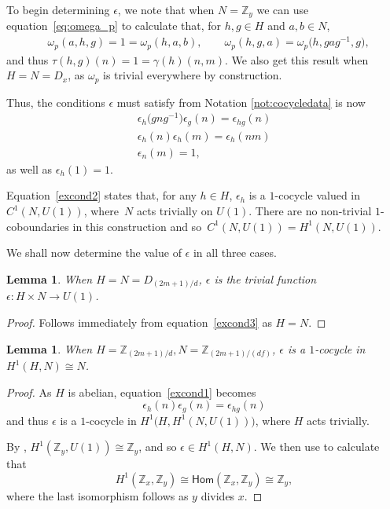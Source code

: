 \documentclass[pdftex]{sigma}
\numberwithin{equation}{section}
\newtheorem{Lemma}[Theorem]{Lemma}
\newcommand{\Hom}{\mathsf{Hom}}
\newcommand{\mZ}{\mathbb{Z}}
\begin{document}
To begin determining $\epsilon$, we note that when $N=\mZ_y$ we can use equation~\eqref{eq:omega_p} to calculate that, for $h,g \in H$ and $a,b \in N$,
\begin{align*}
 &\omega_p(a,h,g) = 1 = \omega_p(h,a,b) ,\qquad
 \omega_p(h,g,a) = \omega_p\big(h,gag^{-1},g\big) ,
\end{align*}
and thus $\tau(h,g)(n) = 1 = \gamma(h)(n,m)$. We also get this result when $H=N=D_x$, as $\omega_p$ is trivial everywhere by construction.

Thus, the conditions $\epsilon$ must satisfy from Notation \ref{not:cocycledata} is now
\begin{gather}
 \epsilon_h\big(gng^{-1}\big)\epsilon_g(n)= \epsilon_{hg}(n)\label{excond1}\\
 \epsilon_h(n)\epsilon_h(m) = \epsilon_h(nm) \label{excond2}\\
 \epsilon_n(m) = 1 \label{excond3},
\end{gather}
as well as $\epsilon_h(1)=1$.

Equation~\eqref{excond2} states that, for any $h\in H$, $\epsilon_h$ is a $1$-cocycle valued in $C^1(N,U(1))$, where~$N$ acts trivially on $U(1)$. There are no non-trivial $1$-coboundaries in this construction and so~$C^1(N,U(1))=H^1(N,U(1))$.

We shall now determine the value of $\epsilon$ in all three cases.

\begin{Lemma}
 When $H=N = D_{(2m+1)/d}$, $\epsilon$ is the trivial function $\epsilon\colon H\times N \to U(1)$.
\end{Lemma}
\begin{proof}
 Follows immediately from equation~\eqref{excond3} as $H=N$.
\end{proof}

\begin{Lemma}
 When $H=\mZ_{(2m+1)/d},N=\mZ_{(2m+1)/(df)}$, $\epsilon$ is a $1$-cocycle in $H^1(H,N)\cong N$.
\end{Lemma}
\begin{proof}
 As $H$ is abelian, equation~\eqref{excond1} becomes
 \begin{equation}\label{excond4}
 \epsilon_h(n)\epsilon_g(n) = \epsilon_{hg}(n)
 \end{equation}
 and thus $\epsilon$ is a $1$-cocycle in $H^1\big(H,H^1(N,U(1))\big)$, where $H$ acts trivially.

 By \cite[equation~2.3.13]{dWP}, $H^1(\mZ_{y},U(1)) \cong \mZ_{y}$, and so $\epsilon \in H^1(H,N)$.
 We then use \cite[Theorem~3.6.5, Corollary 3.3.11, Example 6.2.3]{Wei} to calculate that
 \[H^1(\mZ_x,\mZ_y) \cong \Hom(\mZ_x,\mZ_y)\cong \mZ_y,\]
 where the last isomorphism follows as $y$ divides $x$.
\end{proof}
\end{document}
